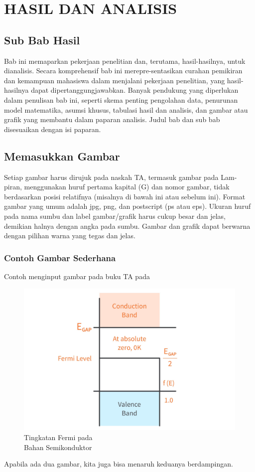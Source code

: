 \chapter{HASIL DAN ANALISIS}

\section{Sub Bab Hasil}
\noindent Bab ini memaparkan pekerjaan penelitian dan, terutama, hasil-hasilnya, untuk dianalisis. Secara komprehensif bab ini merepre-sentasikan curahan pemikiran dan kemampuan mahasiswa dalam menjalani pekerjaan penelitian, yang hasil-hasilnya dapat dipertanggungjawabkan. Banyak pendukung yang diperlukan dalam penulisan bab ini, seperti skema penting pengolahan data, penurunan model matematika, asumsi khusus, tabulasi hasil dan analisis, dan gambar atau grafik yang membantu dalam paparan analisis. Judul bab dan sub bab disesuaikan dengan isi paparan.

\section{Memasukkan Gambar}
\noindent Setiap gambar harus dirujuk pada naskah TA, termasuk gambar pada Lam- piran, menggunakan huruf pertama kapital (G) dan nomor gambar, tidak berdasarkan posisi relatifnya (misalnya di bawah ini atau sebelum ini). Format gambar yang umum adalah jpg, png, dan postscript (ps atau eps). Ukuran huruf pada nama sumbu dan label gambar/grafik harus cukup besar dan jelas, demikian halnya dengan angka pada sumbu. Gambar dan grafik dapat berwarna dengan pilihan warna yang tegas dan jelas.

\subsection{Contoh Gambar Sederhana}
Contoh menginput gambar pada buku TA pada
\begin{figure}[h] %
\centering
\includegraphics[width=0.3\linewidth]{gambar/Semiconductor-Fermi-Level-Band-Diagram-1.jpg}
\caption{Tingkatan Fermi pada\\Bahan Semikonduktor}
\label{fermilevel}
\end{figure}
Apabila ada dua gambar, kita juga bisa menaruh keduanya berdampingan.

